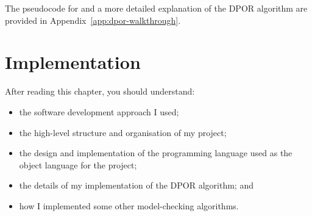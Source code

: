 \documentclass[12pt,a4paper,twoside,openany]{report}
\newcommand{\Let}[2]{\State \textbf{let} #1 = #2 \textbf{in}}
\newenvironment{understandinglist}
	{\begin{itemize} \itemsep 0em}{\end{itemize}}
\begin{document}
The pseudocode for and a more
detailed explanation of the DPOR
algorithm are provided in
Appendix~\ref{app:dpor-walkthrough}.

\newcommand{\dporpseudocode}{
	\begin{algorithmic}[1]
		\Procedure{Explore}{$\pi$}
		\Let{$\sigma$}{$\textit{last}(\pi)$}
		\ForAll{$p \in \mathcal{P}$}
		\State \Call{UpdateBacktrackSets}
		{$\pi,\, \textit{next}(\sigma, p)$}
		\EndFor
		\If{$\textit{enabled}(\sigma) \neq \emptyset$}
		\Let{$t$}{any $t \in \textit{enabled}(\sigma)$}
		\Let{$\textit{backtrack}(\sigma)$}{$\{t\}$}
		\Let{$\textit{done}(\sigma)$}{$\emptyset$}
		\While{$\textit{done}(\sigma)
			 \neq \textit{backtrack}(\sigma)$}
		\Let{$t$}{any $t \in (\textit{backtrack}(\sigma)
			\setminus \textit{done}(\sigma))$}
		\State add $t$ to $\textit{done}(\sigma);$
		\State \Call{Explore}{$\pi.t$}

		\EndWhile
		\EndIf
		\EndProcedure
		\State
		\Procedure{UpdateBacktrackSets}{$\pi,\, t_{p,s}$}
		\Let{$D$}{$\{i \in \textit{dom}(\pi) \mid
			\pi_i \text{ is dependent with } t_{p,s}
			\text{ and } i \not \hookrightarrow_\pi p\}$}
		\If{$D \neq \emptyset$}
		\Let{$\sigma_d$}
		{$\textit{pre}(\pi,\text{max}(D))$}
		\If{$\textit{next}(\sigma_d, p)
			\in \textit{enabled}(\sigma_d)$}
		add $\textit{next}(\sigma_d, p)$
		to $\textit{backtrack}(\sigma_d)$
		\Else {
			add all of $\textit{enabled}(\sigma_d)$
			to $\textit{backtrack}(\sigma_d)$
		} \EndIf
		\EndIf
		\EndProcedure
		\State
		\State Initially: \Call{Explore}{$\emptyset$}
	\end{algorithmic}
}

\chapter{Implementation}
\label{cha:imp}
After reading this chapter,
you should understand:
\begin{understandinglist}
	\item the software development approach
	I used;
	\item the high-level structure and
	organisation of my project;
	\item the design and implementation of
	the programming language used
	as the object language for the
	project;
	\item the details of my
	implementation of the DPOR algorithm; and
	\item how I implemented some other
	model-checking algorithms.
\end{understandinglist}
\end{document}
